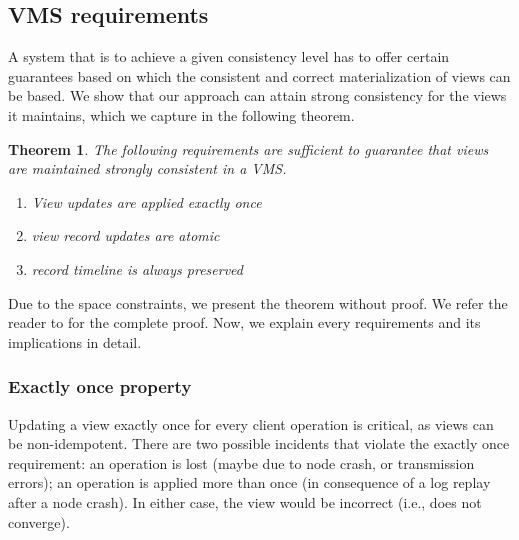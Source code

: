 \subsection{VMS requirements} 
\label{subsec:vms_requirements} 

A system that is to achieve a given consistency level has to offer
certain guarantees based on which the consistent and correct
materialization of views can be based.  We show that our approach can
attain strong consistency for the views it maintains, which we capture
in the following theorem.\\


\newtheorem{theorem}{Theorem}
\begin{theorem}
\label{theo:strong_consistency}
The following requirements are sufficient to guarantee that views are
maintained \textit{strongly} consistent in a VMS.

\begin{enumerate}
	\item  View updates are applied \textit{exactly once}
	\item  view record updates are \textit{atomic}
	\item  record \textit{timeline} is always preserved
\end{enumerate}
\end{theorem}
\hfill \newline
Due to the space constraints, we present the theorem without proof.
We refer the reader to \cite{extended:version} for the complete proof. 
Now, we explain every requirements and its implications in detail. 

\subsubsection{Exactly once property}
\label{subsubsec:exactly_once}  
Updating a view exactly once for every client operation is critical, 
as views can be non-idempotent. There are two possible incidents that 
violate the exactly once requirement: an operation is lost (maybe due to 
node crash, or transmission errors); an operation is applied 
more than once (in consequence of a log replay after a node crash). 
In either case, the view would be incorrect (i.e., does not converge).
 


%

